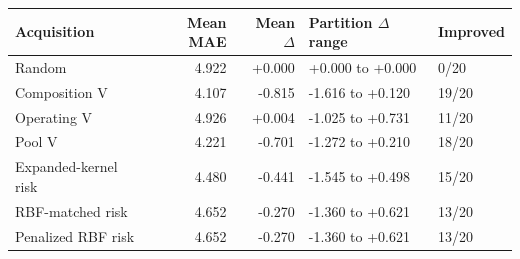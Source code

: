 \begin{tabular}{lrrll}\toprule
Acquisition & Mean MAE & Mean $\Delta$ & Partition $\Delta$ range & Improved \\ \midrule
Random & 4.922 & +0.000 & +0.000 to +0.000 & 0/20 \\
Composition V & 4.107 & -0.815 & -1.616 to +0.120 & 19/20 \\
Operating V & 4.926 & +0.004 & -1.025 to +0.731 & 11/20 \\
Pool V & 4.221 & -0.701 & -1.272 to +0.210 & 18/20 \\
Expanded-kernel risk & 4.480 & -0.441 & -1.545 to +0.498 & 15/20 \\
RBF-matched risk & 4.652 & -0.270 & -1.360 to +0.621 & 13/20 \\
Penalized RBF risk & 4.652 & -0.270 & -1.360 to +0.621 & 13/20 \\
\bottomrule\end{tabular}
